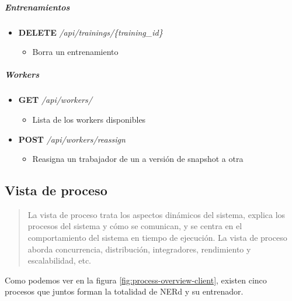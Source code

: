 \documentclass[12pt,a4paper,]{scrartcl}
\providecommand{\tightlist}{%
  \setlength{\itemsep}{0pt}\setlength{\parskip}{0pt}}
\let\oldsubparagraph\subparagraph
\renewcommand{\subparagraph}[1]{\oldsubparagraph{#1}\mbox{}}
\begin{document}
\hypertarget{entrenamientos}{%
\subparagraph{Entrenamientos}\label{entrenamientos}}

\begin{itemize}
\tightlist
\item
  \textbf{DELETE} \emph{/api/trainings/\{training\_id\}}

  \begin{itemize}
  \tightlist
  \item
    Borra un entrenamiento
  \end{itemize}
\end{itemize}

\hypertarget{workers}{%
\subparagraph{Workers}\label{workers}}

\begin{itemize}
\tightlist
\item
  \textbf{GET} \emph{/api/workers/}

  \begin{itemize}
  \tightlist
  \item
    Lista de los workers disponibles
  \end{itemize}
\item
  \textbf{POST} \emph{/api/workers/reassign}

  \begin{itemize}
  \tightlist
  \item
    Reasigna un trabajador de un a versión de snapshot a otra
  \end{itemize}
\end{itemize}

\hypertarget{vista-de-proceso}{%
\subsection{Vista de proceso}\label{vista-de-proceso}}

\begin{quote}
La vista de proceso trata los aspectos dinámicos del sistema, explica los procesos del sistema y cómo se comunican, y se centra en el comportamiento del sistema en tiempo de ejecución.
La vista de proceso aborda concurrencia, distribución, integradores, rendimiento y escalabilidad, etc.
\end{quote}

Como podemos ver en la figura \ref{fig:process-overview-client}, existen cinco procesos que juntos forman la totalidad de NERd y su entrenador.
\end{document}
